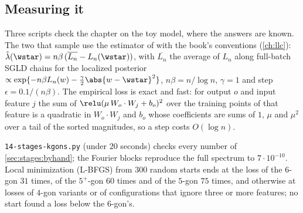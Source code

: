 \begin{refsection}
\section{Measuring it}\label{sec:stages:measuring}

Three scripts check the chapter on the toy model, where the answers are known. The two that sample use the estimator of \textcite{LauEtAl2025} with the book's conventions (\cref{ch:llc}): $\hat\lambda(\wstar)=n\beta\,(\overline{L_n}-L_n(\wstar))$, with $\overline{L_n}$ the average of $L_n$ along full-batch SGLD chains for the localized posterior $\propto\exp\{-n\beta L_n(w)-\frac\gamma2\abs{w-\wstar}^2\}$, $n\beta=n/\log n$, $\gamma=1$ and step $\epsilon=0.1/(n\beta)$. The empirical loss is exact and fast: for output $o$ and input feature $j$ the sum of $\relu(\mu\,W_o\cdot W_j+b_o)^2$ over the training points of that feature is a quadratic in $W_o\cdot W_j$ and $b_o$ whose coefficients are sums of $1$, $\mu$ and $\mu^2$ over a tail of the sorted magnitudes, so a step costs $O(\log n)$.

\texttt{14-stages-kgons.py} (under $20$ seconds) checks every number of \cref{sec:stages:byhand}; the Fourier blocks reproduce the full spectrum to $7\cdot10^{-10}$. Local minimization (L-BFGS) from $300$ random starts ends at the loss of the $6$-gon $31$ times, of the $5^+$-gon $60$ times and of the $5$-gon $75$ times, and otherwise at losses of $4$-gon variants or of configurations that ignore three or more features; no start found a loss below the $6$-gon's.


\end{refsection}
